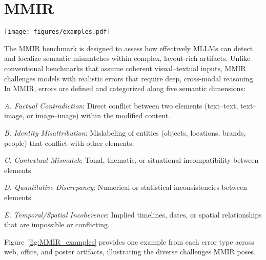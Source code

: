 \section{MMIR}

\begin{figure*}[t]
\setlength\tabcolsep{0pt}
\setlength{\abovecaptionskip}{0.1cm}
    \centering
    \texttt{[image: figures/examples.pdf]}
    \vspace{-20pt}
    \caption{There are five inconsistency categories in the MMIR benchmark, posing diverse challenges.}
    \label{fig:MMIR_examples}
\end{figure*}

The MMIR benchmark is designed to assess how effectively MLLMs can detect and localize semantic mismatches within complex, layout-rich artifacts. Unlike conventional benchmarks that assume coherent visual–textual inputs, MMIR challenges models with realistic errors that require deep, cross-modal reasoning. In MMIR, errors are defined and categorized along five semantic dimensions:

\textit{A. Factual Contradiction}: Direct conflict between two elements (text–text, text–image, or image–image) within the modified content.

\textit{B. Identity Misattribution}: Mislabeling of entities (objects, locations, brands, people) that conflict with other elements.
    
\textit{C. Contextual Mismatch}: Tonal, thematic, or situational incompatibility between elements.

\textit{D. Quantitative Discrepancy}: Numerical or statistical inconsistencies between elements.

\textit{E. Temporal/Spatial Incoherence}: Implied timelines, dates, or spatial relationships that are impossible or conflicting.

Figure~\ref{fig:MMIR_examples} provides one example from each error type across web, office, and poster artifacts, illustrating the diverse challenges MMIR poses. 

